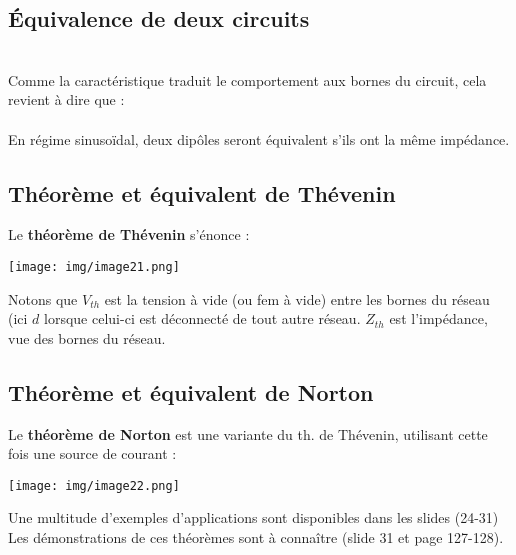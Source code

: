 \documentclass[british,french,11pt, a4paper, openany]{book}
\begin{document}
		\subsection{Équivalence de deux circuits}
		\ \\
		
		Comme la caractéristique traduit le comportement aux bornes du circuit, cela revient à dire que :\\
		\ \\
		
		En régime sinusoïdal, deux dipôles seront équivalent s'ils ont la même impédance.
		
		
		\subsection{Théorème et équivalent de Thévenin}
		Le \textbf{théorème de Thévenin} s'énonce :\\
		
		\begin{center}
			\texttt{[image: img/image21.png]}
		\end{center}
		Notons que $V_{th}$ est la tension à vide (ou fem à vide) entre les bornes du réseau (ici $d$ lorsque celui-ci est déconnecté de tout autre réseau. 
		$Z_{th}$ est l'impédance, vue des bornes du réseau.
		
		
		\subsection{Théorème et équivalent de Norton}
		Le \textbf{théorème de Norton} est une variante du th. de Thévenin, utilisant cette fois une source de courant :\\
		\begin{center}
			\texttt{[image: img/image22.png]}
		\end{center}
		
		
		Une multitude d'exemples d'applications sont disponibles dans les slides (24-31)\\
		Les démonstrations de ces théorèmes sont à connaître (slide 31 et page 127-128).
		
\end{document}
